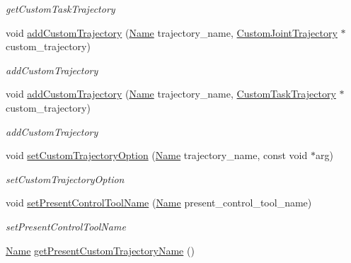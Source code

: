 \begin{DoxyCompactItemize}
\begin{DoxyCompactList}\small\item\em get\+Custom\+Task\+Trajectory \end{DoxyCompactList}\item 
void \hyperlink{classrobotis__manipulator_1_1_trajectory_a4d7f38c0e931889ba513dfa1a9fae3df}{add\+Custom\+Trajectory} (\hyperlink{namespacerobotis__manipulator_a08c2d25e77a01ad75b9bb740f8ce4765}{Name} trajectory\+\_\+name, \hyperlink{classrobotis__manipulator_1_1_custom_joint_trajectory}{Custom\+Joint\+Trajectory} $\ast$custom\+\_\+trajectory)
\begin{DoxyCompactList}\small\item\em add\+Custom\+Trajectory \end{DoxyCompactList}\item 
void \hyperlink{classrobotis__manipulator_1_1_trajectory_a6e35e2a6ce37644e479e188c842f4532}{add\+Custom\+Trajectory} (\hyperlink{namespacerobotis__manipulator_a08c2d25e77a01ad75b9bb740f8ce4765}{Name} trajectory\+\_\+name, \hyperlink{classrobotis__manipulator_1_1_custom_task_trajectory}{Custom\+Task\+Trajectory} $\ast$custom\+\_\+trajectory)
\begin{DoxyCompactList}\small\item\em add\+Custom\+Trajectory \end{DoxyCompactList}\item 
void \hyperlink{classrobotis__manipulator_1_1_trajectory_a9376519929c9ac310590f92784950ed3}{set\+Custom\+Trajectory\+Option} (\hyperlink{namespacerobotis__manipulator_a08c2d25e77a01ad75b9bb740f8ce4765}{Name} trajectory\+\_\+name, const void $\ast$arg)
\begin{DoxyCompactList}\small\item\em set\+Custom\+Trajectory\+Option \end{DoxyCompactList}\item 
void \hyperlink{classrobotis__manipulator_1_1_trajectory_a6ffae7998c29d372196b83ed63eb0540}{set\+Present\+Control\+Tool\+Name} (\hyperlink{namespacerobotis__manipulator_a08c2d25e77a01ad75b9bb740f8ce4765}{Name} present\+\_\+control\+\_\+tool\+\_\+name)
\begin{DoxyCompactList}\small\item\em set\+Present\+Control\+Tool\+Name \end{DoxyCompactList}\item 
\hyperlink{namespacerobotis__manipulator_a08c2d25e77a01ad75b9bb740f8ce4765}{Name} \hyperlink{classrobotis__manipulator_1_1_trajectory_acc33565a63cb8d328170bb8486d910b1}{get\+Present\+Custom\+Trajectory\+Name} ()

\end{DoxyCompactItemize}
